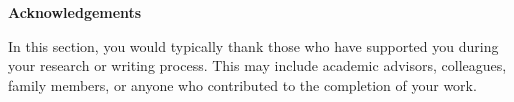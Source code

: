 \thispagestyle{plain}

\begin{center}
  \textbf{Acknowledgements}
\end{center}

\vspace{1cm} %

\noindent
In this section, you would typically thank those who have supported you during your research or writing process. This may include academic advisors, colleagues, family members, or anyone who contributed to the completion of your work.

\vfill

\pagebreak



